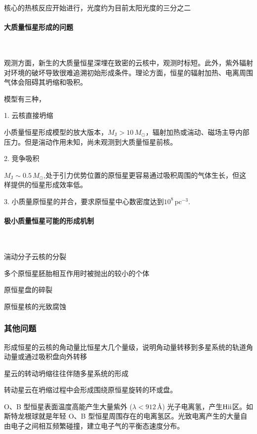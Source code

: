 \documentclass[../天体物理基础.tex]{subfiles}
\begin{document}
核心的热核反应开始进行，光度约为目前太阳光度的三分之二

\paragraph{大质量恒星形成的问题}~{}

观测方面，新生的大质量恒星深埋在致密的云核中，观测时标短。此外，紫外辐射对环境的破坏导致很难追溯初始形成条件。理论方面，恒星的辐射加热、电离周围气体会阻碍其坍缩和吸积。

模型有三种，

1. 云核直接坍缩

小质量恒星形成模型的放大版本，$M_{\text{J}}>10\,M_{\odot}$，辐射加热或湍动、磁场主导内部压力。但是湍动作用未知，尚未观测到大质量恒星前核。

2. 竞争吸积

$M_{\text{J}}\sim0.5\,M_{\odot}$,处于引力优势位置的原恒星更容易通过吸积周围的气体生长，但这样提供的恒星形成效率低。

3. 小质量原恒星的并合，要求原恒星中心数密度达到$10^{8}\,\mathrm{pc^{-3}}$.

\paragraph{极小质量恒星可能的形成机制}~{}

湍动分子云核的分裂

多个原恒星胚胎相互作用时被抛出的较小的个体

原恒星盘的碎裂

原恒星核的光致腐蚀

\subsubsection{其他问题}

形成恒星的云核的角动量比恒星大几个量级，说明角动量转移到多星系统的轨道角动量或通过吸积盘向外转移

星云的转动坍缩往往伴随多星系统的形成

转动星云在坍缩过程中会形成围绕原恒星旋转的环或盘。




O、B 型恒星表面温度高能产生大量紫外 ($\lambda<912\,\si{\angstrom}$) 光子电离氢，产生$\mathrm{H\uppercase\expandafter{\romannumeral 2}}$区。如斯特龙根球就是年轻 O、B 型恒星周围存在的电离氢区。光致电离产生的大量自由电子之间相互频繁碰撞，建立电子气的平衡态速度分布。



\end{document}
